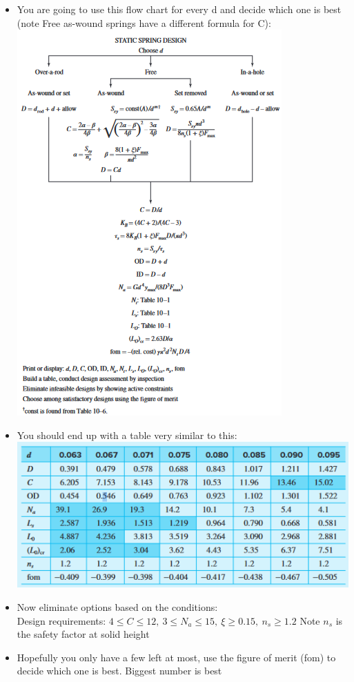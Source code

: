 \documentclass[11pt, fleqn]{article}
\begin{document}
\begin{itemize}
    \item You are going to use this flow chart for every d and decide which one is best (note Free as-wound springs have a different formula for C):\\
    \includegraphics{Springs/Fig10-3.png}\\

    \item You should end up with a table very similar to this:\\
    \includegraphics[scale=0.8]{Springs/TabEx.png}\\

    \item Now eliminate options based on the conditions:\\
    Design requirements: $4\leq C \leq 12, \: 3\leq N_a\leq 15, \: \xi \geq 0.15, \: n_s \geq 1.2$ Note $n_s$ is the safety factor at solid height\\

    \item Hopefully you only have a few left at most, use the figure of merit (fom) to decide which one is best. Biggest number is best
\end{itemize}
\end{document}
